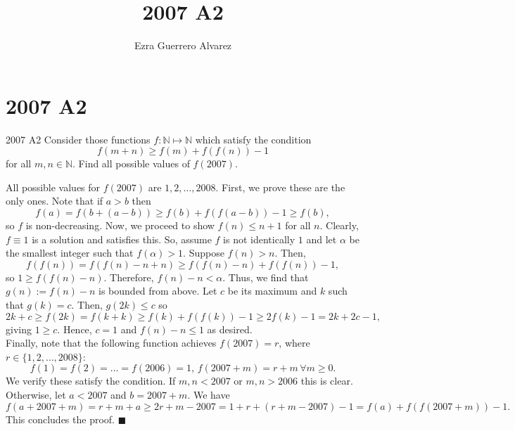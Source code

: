 \documentclass[14pt]{article}
\title{2007 A2}
\author{Ezra Guerrero Alvarez}
\begin{document}
\maketitle
	
\section*{2007 A2}

\begin{statement}{2007 A2}
	Consider those functions $ f: \mathbb{N} \mapsto \mathbb{N}$ which satisfy the condition
	\[ f(m + n) \geq f(m) + f(f(n)) - 1 \]
	for all $ m,n \in \mathbb{N}.$ Find all possible values of $ f(2007).$
\end{statement}
All possible values for $f(2007)$ are $1,2,\ldots,2008$. First, we prove these are the only ones. Note that if $a>b$ then
\[ f(a)=f(b+(a-b))\ge f(b)+f(f(a-b))-1\ge f(b), \]
so $f$ is non-decreasing. Now, we proceed to show $f(n)\le n+1$ for all $n$. Clearly, $f\equiv 1$ is a solution and satisfies this. So, assume $f$ is not identically $1$ and let $\alpha$ be the smallest integer such that $f(\alpha)>1$. Suppose $f(n)>n$. Then,
\[ f(f(n))=f(f(n)-n+n)\ge f(f(n)-n)+f(f(n))-1, \]
so $1\ge f(f(n)-n)$. Therefore, $f(n)-n<\alpha$. Thus, we find that $g(n):=f(n)-n$ is bounded from above. Let $c$ be its maximum and $k$ such that $g(k)=c$. Then, $g(2k)\le c$ so
\[ 2k+c\ge f(2k)=f(k+k)\ge f(k)+f(f(k))-1\ge 2f(k)-1=2k+2c-1, \]
giving $1\ge c$. Hence, $c=1$ and $f(n)-n\le 1$ as desired.\\
Finally, note that the following function achieves $f(2007)=r$, where $r\in\{1,2,\ldots,2008\}$:
\[ f(1)=f(2)=\ldots=f(2006)=1,\,f(2007+m)=r+m\,\forall m\ge0. \]
We verify these satisfy the condition. If $m,n<2007$ or $m,n>2006$ this is clear. Otherwise, let $a<2007$ and $b=2007+m$. We have
\[ f(a+2007+m)=r+m+a\ge 2r+m-2007=1+r+(r+m-2007)-1=f(a)+f(f(2007+m))-1. \]
This concludes the proof. $\blacksquare$
	
\end{document}
